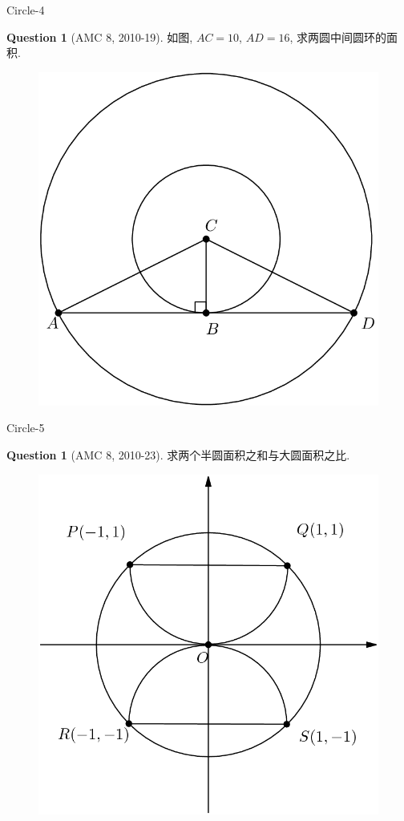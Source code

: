 \documentclass{beamer}
\theoremstyle{definition}
\newtheorem{ques}[defn]{Question}
\begin{document}
\begin{frame}{Circle-4}
    \begin{ques}[AMC 8, 2010-19]
        如图, $AC=10$, $AD=16$, 求两圆中间圆环的面积.
    \end{ques}
    \begin{figure}
        \includegraphics[height=0.4\textheight]{circle5.png}
    \end{figure}
\end{frame}
\begin{frame}{Circle-5}
    \begin{ques}[AMC 8, 2010-23]
        求两个半圆面积之和与大圆面积之比.
    \end{ques}
    \begin{figure}
        \includegraphics[height=0.4\textheight]{circle6.png}
    \end{figure}
\end{frame}
\end{document}
